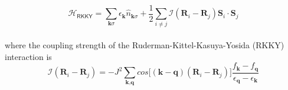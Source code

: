 \documentclass{article}
\begin{document}
\\
\begin{equation}
\mathcal{H}_{\textsf{RKKY}} = \sum_{\textbf{k}\sigma} \epsilon_{\textbf{k}}\hat{n}_{\textbf{k}\sigma} + \frac{1}{2} \sum_{i \neq j} \mathcal{I}(\textbf{R}_i - \textbf{R}_j) \textbf{S}_i \cdot \textbf{S}_j
\end{equation}
\\
where the coupling strength of the Ruderman-Kittel-Kasuya-Yosida (RKKY) interaction is 
\\
\begin{equation}
\mathcal{I}(\textbf{R}_i - \textbf{R}_j) = - J^2 \sum_{\textbf{k}, \textbf{q}}cos\big[(\textbf{k}-\textbf{q})(\textbf{R}_i-\textbf{R}_j)\big]  \frac{f_\textbf{k} - f_\textbf{q}}{\epsilon_{\textbf{q}} - \epsilon_{\textbf{k}}}
\end{equation}
\end{document}
